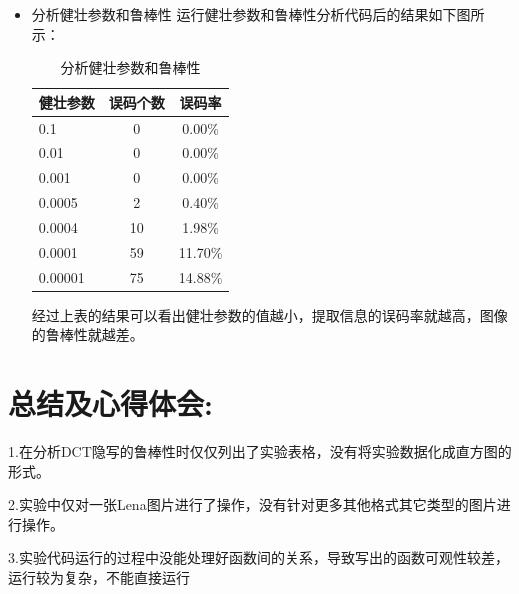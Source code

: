 \documentclass[a4paper,11pt,UTF8]{ctexart}
\begin{document}
\begin{itemize}
    \item 分析健壮参数和鲁棒性
        运行健壮参数和鲁棒性分析代码后的结果如下图所示：
        \begin{table}[!h!tbp]
          \caption{分析健壮参数和鲁棒性}\label{tab2}
            \centering
          \begin{tabular*}{0.75\textwidth}{@{\extracolsep{\fill}}lcc}
              \toprule
              健壮参数          &误码个数       &误码率                \\
              \midrule
              0.1                 &0           &0.00\%               \\
              0.01                &0           &0.00\%           \\
              0.001               &0           &0.00\%            \\
              0.0005              &2           &0.40\%          \\
              0.0004              &10          &1.98\%            \\
              0.0001              &59          &11.70\%          \\
              0.00001             &75          &14.88\%         \\
              \bottomrule			
          \end{tabular*}
        \end{table}\par
        经过上表的结果可以看出健壮参数的值越小，提取信息的误码率就越高，图像的鲁棒性就越差。
  \end{itemize}

\section{总结及心得体会:}
    1.在分析DCT隐写的鲁棒性时仅仅列出了实验表格，没有将实验数据化成直方图的形式。\par
    2.实验中仅对一张Lena图片进行了操作，没有针对更多其他格式其它类型的图片进行操作。\par
    3.实验代码运行的过程中没能处理好函数间的关系，导致写出的函数可观性较差，运行较为复杂，不能直接运行
\vspace{4cm}
\begin{flushright}
\begin{tabular}{lc}
\end{tabular}
\end{flushright}
\end{document}

